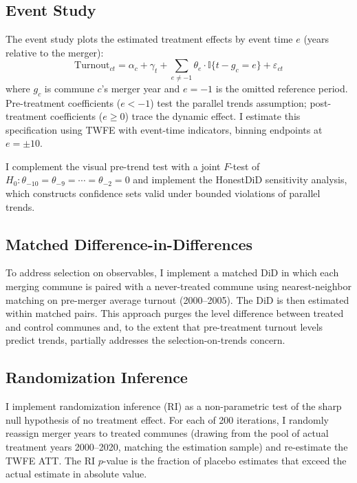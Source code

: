 \documentclass[12pt]{article}
\newcommand{\ind}{\mathbb{I}}
\begin{document}
\subsection{Event Study}

The event study plots the estimated treatment effects by event time $e$ (years relative to the merger):
\begin{equation}
\label{eq:eventstudy}
    \text{Turnout}_{ct} = \alpha_c + \gamma_t + \sum_{e \neq -1} \theta_e \cdot \ind\{t - g_c = e\} + \varepsilon_{ct}
\end{equation}
where $g_c$ is commune $c$'s merger year and $e = -1$ is the omitted reference period. Pre-treatment coefficients ($e < -1$) test the parallel trends assumption; post-treatment coefficients ($e \geq 0$) trace the dynamic effect. I estimate this specification using TWFE with event-time indicators, binning endpoints at $e = \pm 10$.

I complement the visual pre-trend test with a joint $F$-test of $H_0: \theta_{-10} = \theta_{-9} = \cdots = \theta_{-2} = 0$ and implement the \citet{rambachan2023more} HonestDiD sensitivity analysis, which constructs confidence sets valid under bounded violations of parallel trends.

\subsection{Matched Difference-in-Differences}

To address selection on observables, I implement a matched DiD in which each merging commune is paired with a never-treated commune using nearest-neighbor matching on pre-merger average turnout (2000--2005). The DiD is then estimated within matched pairs. This approach purges the level difference between treated and control communes and, to the extent that pre-treatment turnout levels predict trends, partially addresses the selection-on-trends concern.

\subsection{Randomization Inference}

I implement randomization inference (RI) as a non-parametric test of the sharp null hypothesis of no treatment effect. For each of 200 iterations, I randomly reassign merger years to treated communes (drawing from the pool of actual treatment years 2000--2020, matching the estimation sample) and re-estimate the TWFE ATT. The RI $p$-value is the fraction of placebo estimates that exceed the actual estimate in absolute value.
\end{document}
